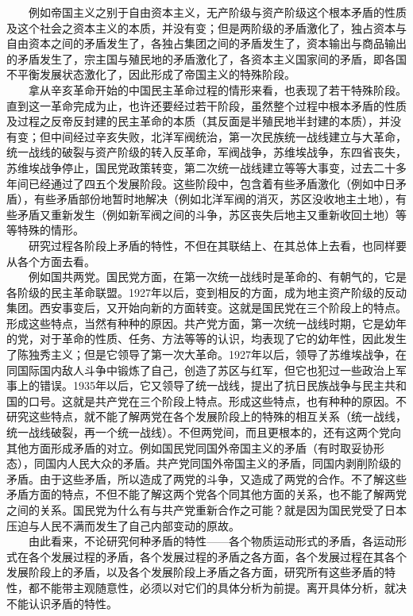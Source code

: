\documentclass[cn,11pt,chinese]{elegantbook}
\begin{document}
　　例如帝国主义之别于自由资本主义，无产阶级与资产阶级这个根本矛盾的性质及这个社会之资本主义的本质，并没有变；但是两阶级的矛盾激化了，独占资本与自由资本之间的矛盾发生了，各独占集团之间的矛盾发生了，资本输出与商品输出的矛盾发生了，宗主国与殖民地的矛盾激化了，各资本主义国家间的矛盾，即各国不平衡发展状态激化了，因此形成了帝国主义的特殊阶段。\\
　　拿从辛亥革命开始的中国民主革命过程的情形来看，也表现了若干特殊阶段。直到这一革命完成为止，也许还要经过若干阶段，虽然整个过程中根本矛盾的性质及过程之反帝反封建的民主革命的本质（其反面是半殖民地半封建的本质），并没有变；但中间经过辛亥失败，北洋军阀统治，第一次民族统一战线建立与大革命，统一战线的破裂与资产阶级的转入反革命，军阀战争，苏维埃战争，东四省丧失，苏维埃战争停止，国民党政策转变，第二次统一战线建立等等大事变，过去二十多年间已经通过了四五个发展阶段。这些阶段中，包含着有些矛盾激化（例如中日矛盾），有些矛盾部份地暂时地解决（例如北洋军阀的消灭，苏区没收地主土地），有些矛盾又重新发生（例如新军阀之间的斗争，苏区丧失后地主又重新收回土地）等等特殊的情形。\\
　　研究过程各阶段上矛盾的特性，不但在其联结上、在其总体上去看，也同样要从各个方面去看。\\
　　例如国共两党。国民党方面，在第一次统一战线时是革命的、有朝气的，它是各阶级的民主革命联盟。1927年以后，变到相反的方面，成为地主资产阶级的反动集团。西安事变后，又开始向新的方面转变。这就是国民党在三个阶段上的特点。形成这些特点，当然有种种的原因。共产党方面，第一次统一战线时期，它是幼年的党，对于革命的性质、任务、方法等等的认识，均表现了它的幼年性，因此发生了陈独秀主义；但是它领导了第一次大革命。1927年以后，领导了苏维埃战争，在同国际国内敌人斗争中锻炼了自己，创造了苏区与红军，但它也犯过一些政治上军事上的错误。1935年以后，它又领导了统一战线，提出了抗日民族战争与民主共和国的口号。这就是共产党在三个阶段上特点。形成这些特点，也有种种的原因。不研究这些特点，就不能了解两党在各个发展阶段上的特殊的相互关系（统一战线，统一战线破裂，再一个统一战线）。不但两党间，而且更根本的，还有这两个党向其他方面形成矛盾的对立。例如国民党同国外帝国主义的矛盾（有时取妥协形态），同国内人民大众的矛盾。共产党同国外帝国主义的矛盾，同国内剥削阶级的矛盾。由于这些矛盾，所以造成了两党的斗争，又造成了两党的合作。不了解这些矛盾方面的特点，不但不能了解这两个党各个同其他方面的关系，也不能了解两党之间的关系。国民党为什么有与共产党重新合作之可能？就是因为国民党受了日本压迫与人民不满而发生了自己内部变动的原故。\\
　　由此看来，不论研究何种矛盾的特性——各个物质运动形式的矛盾，各运动形式在各个发展过程的矛盾，各个发展过程的矛盾之各方面，各个发展过程在其各个发展阶段上的矛盾，以及各个发展阶段上矛盾之各方面，研究所有这些矛盾的特性，都不能带主观随意性，必须以对它们的具体分析为前提。离开具体分析，就决不能认识矛盾的特性。\\
\end{document}
